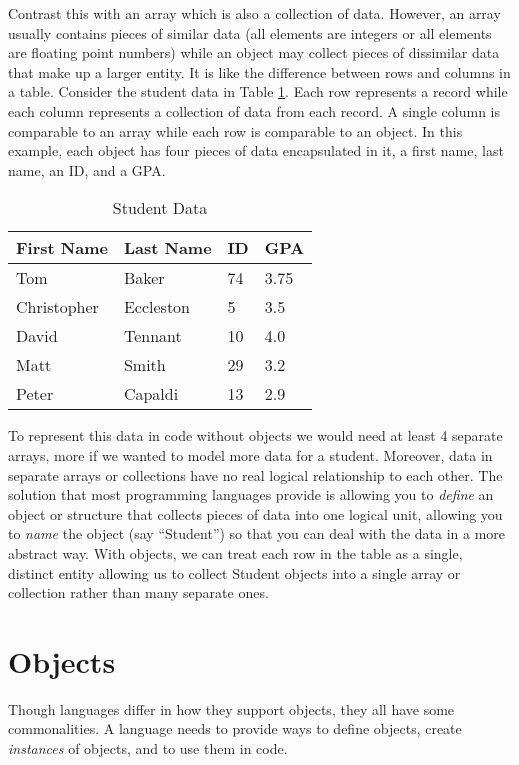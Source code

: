 Contrast this with an array which is also a collection of data.
However, an array usually contains pieces of similar data (all
elements are integers or all elements are floating point numbers) 
while an object may collect pieces of dissimilar data that make up a
larger entity.  It is like the difference between rows
and columns in a table.  Consider the student data in Table
\ref{table:studentData}.  Each row represents a record while each
column represents a collection of data from each record.  A
single column is comparable to an array while each row is comparable
to an object.  In this example, each object has four pieces of data
encapsulated in it, a first name, last name, an ID, and a GPA.

\begin{table}
\centering
\begin{tabular}{|l|l|l|l|}
\hline
First Name & Last Name & ID & GPA \\
\hline\hline
Tom & Baker & 74 & 3.75 \\
\hline
Christopher & Eccleston & 5 & 3.5 \\
\hline
David & Tennant & 10 & 4.0 \\
\hline
Matt & Smith & 29 & 3.2 \\
\hline
Peter & Capaldi & 13 & 2.9 \\
\hline
\end{tabular}
\caption{Student Data}
\label{table:studentData}
\end{table}

To represent this data in code without objects we would need at least
4 separate arrays, more if we wanted to model more data for a student.  
Moreover, data in separate arrays or collections have no real logical
relationship to each other.  The solution that most programming languages
provide is allowing you to \emph{define} an object or structure that
collects pieces of data into one logical unit, allowing you to \emph{name}
the object (say ``Student'') so that you can deal with the data in
a more abstract way.  With objects, we can treat each row in the table
as a single, distinct entity allowing us to collect Student objects
into a single array or collection rather than many separate ones.

\section{Objects}

Though languages differ in how they support objects, they all have
some commonalities.  A language needs to provide ways to define objects,
create \emph{instances} of objects, and to use them in code.

